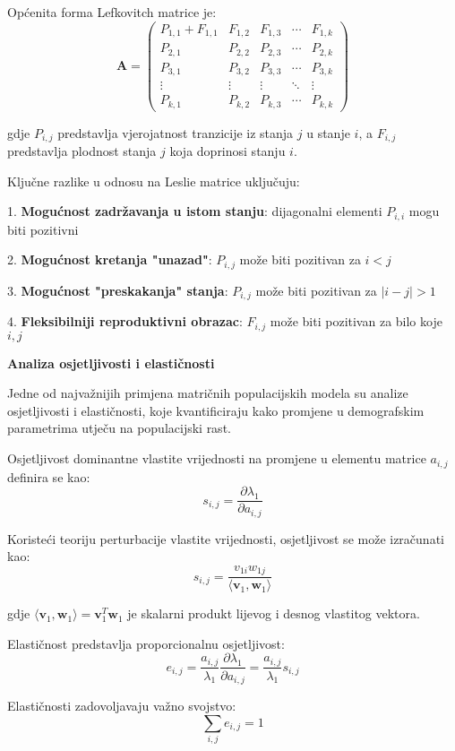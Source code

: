 \documentclass[11pt,oneside]{book}
\begin{document}
Općenita forma Lefkovitch matrice je:
$$\mathbf{A} = \begin{pmatrix}
	P_{1,1} + F_{1,1} & F_{1,2} & F_{1,3} & \cdots & F_{1,k} \\
	P_{2,1} & P_{2,2} & P_{2,3} & \cdots & P_{2,k} \\
	P_{3,1} & P_{3,2} & P_{3,3} & \cdots & P_{3,k} \\
	\vdots & \vdots & \vdots & \ddots & \vdots \\
	P_{k,1} & P_{k,2} & P_{k,3} & \cdots & P_{k,k}
\end{pmatrix}$$

gdje $P_{i,j}$ predstavlja vjerojatnost tranzicije iz stanja $j$ u stanje $i$, a $F_{i,j}$ predstavlja plodnost stanja $j$ koja doprinosi stanju $i$.

Ključne razlike u odnosu na Leslie matrice uključuju:

1. \textbf{Mogućnost zadržavanja u istom stanju}: dijagonalni elementi $P_{i,i}$ mogu biti pozitivni

2. \textbf{Mogućnost kretanja "unazad"}: $P_{i,j}$ može biti pozitivan za $i < j$ 
 
3. \textbf{Mogućnost "preskakanja" stanja}: $P_{i,j}$ može biti pozitivan za $|i-j| > 1$

4. \textbf{Fleksibilniji reproduktivni obrazac}: $F_{i,j}$ može biti pozitivan za bilo koje $i,j$


\textbf{Analiza osjetljivosti i elastičnosti}

Jedne od najvažnijih primjena matričnih populacijskih modela su analize osjetljivosti i elastičnosti, koje kvantificiraju kako promjene u demografskim parametrima utječu na populacijski rast.

Osjetljivost dominantne vlastite vrijednosti na promjene u elementu matrice $a_{i,j}$ definira se kao:
$$s_{i,j} = \frac{\partial \lambda_1}{\partial a_{i,j}}$$

Koristeći teoriju perturbacije vlastite vrijednosti, osjetljivost se može izračunati kao:
$$s_{i,j} = \frac{v_{1i} w_{1j}}{\langle \mathbf{v}_1, \mathbf{w}_1 \rangle}$$

gdje $\langle \mathbf{v}_1, \mathbf{w}_1 \rangle = \mathbf{v}_1^T \mathbf{w}_1$ je skalarni produkt lijevog i desnog vlastitog vektora.

Elastičnost predstavlja proporcionalnu osjetljivost:
$$e_{i,j} = \frac{a_{i,j}}{\lambda_1} \frac{\partial \lambda_1}{\partial a_{i,j}} = \frac{a_{i,j}}{\lambda_1} s_{i,j}$$

Elastičnosti zadovoljavaju važno svojstvo:
$$\sum_{i,j} e_{i,j} = 1$$
\end{document}

